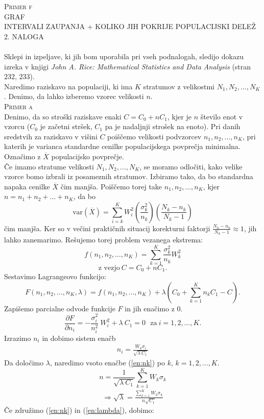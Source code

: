 \documentclass[a4paper,12pt]{article}
\begin{document}

\noindent
\textsc{Primer f}
\\
GRAF 
\\
INTERVALI ZAUPANJA + KOLIKO JIH POKRIJE POPULACIJSKI DELEŽ
\\


\noindent
\textsc{\large{2. NALOGA}}
\\
\\
Sklepi in izpeljave, ki jih bom uporabila pri vseh podnalogah, sledijo dokazu izreka v knjigi \textit{John A. Rice: Mathematical Statistics and Data Analysis} (stran $232$, $233$).
\\
Naredimo raziskavo na populaciji, ki ima $K$ stratumov z velikostmi $N_1, N_2, \ldots, N_K$. Denimo, da lahko izberemo vzorec velikosti $n$.
\\

\noindent
\textsc{Primer a}
\\
Denimo, da so stroški raziskave enaki $C = C_0 + n C_1$, kjer je $n$ število enot v vzorcu ($C_0$ je začetni stršek, $C_1$ pa je nadaljnji strošek na enoto). Pri danih sredstvih za raziskavo v višini $C$ poiščemo velikosti podvzorcev $n_1, n_2, \ldots, n_K$, pri katerih je varianca standardne cenilke populacijskega povprečja minimalna.
\\
Označimo z $\overline{X}$ populacijsko povprečje.
\\
Če imamo stratume velikosti $N_1, N_2, \ldots, N_K$, se moramo odločiti, kako velike vzorce bomo izbrali iz posameznih stratumov. Izbiramo tako, da bo standardna napaka cenilke $\overline{X}$ čim manjša. 
Poiščemo torej take $n_1, n_2, \ldots, n_K$, kjer $n = n_1 + n_2 + \ldots + n_K$, da bo $$ \text{var}(\overline{X}) = \sum_{i = k}^{K} W_i ^ 2 \left( \frac{ \sigma_k^2}{n_k} \right) \left( \frac{N_k - n_k}{N_k - 1} \right) $$
čim manjša.
Ker so v večini praktičnih situacij korekturni faktorji $\frac{N_k - n_k}{N_k - 1} \approx 1$, jih lahko zanemarimo. Rešujemo torej problem vezanega ekstrema:
$$ f(n_1, n_2, \ldots, n_K) = \sum_{k = 1}^{K} \frac{\sigma_k^2}{n_k} W_k^2 $$
$$ \text{z vezjo} \  C = C_0 + nC_1.$$
Sestavimo Lagrangeovo funkcijo:
$$ F(n_1, n_2, \ldots, n_K, \lambda) = f(n_1, n_2, \ldots, n_K) + \lambda (C_0 + \sum_{k = 1}^{K} n_k C_1 - C). $$
Zapišemo parcialne odvode funkcije $F$ in jih enačimo z $0$.
$$ \frac{ \partial F}{\partial n_i} = - \frac{ \sigma_i^2}{n_i^2} \  W_i^2 + \lambda \ C_1 = 0 \ \ \ \text{za} \ i = 1, 2, \ldots, K. $$
Izrazimo $n_i$ in dobimo sistem enačb
\begin{align}\label{en:nk}
n_i = \frac{W_k \sigma_i}{ \sqrt{ \lambda \ C_1}}
\end{align}
Da določimo $\lambda$, naredimo vsoto enačbe (\ref{en:nk}) po $k$, $k = 1, 2, \ldots, K.$
$$ n = \frac{1}{\sqrt{\lambda \ C_1}} \sum_{k = 1}^{K} W_k \sigma_k $$
\begin{align}\label{en:lambda}
\Rightarrow \sqrt{\lambda} = \frac{\sum_{k = 1}^{K} W_k \sigma_k}{n \sqrt{C_1}}
\end{align}
Če združimo (\ref{en:nk}) in (\ref{en:lambda}), dobimo:
\end{document}
